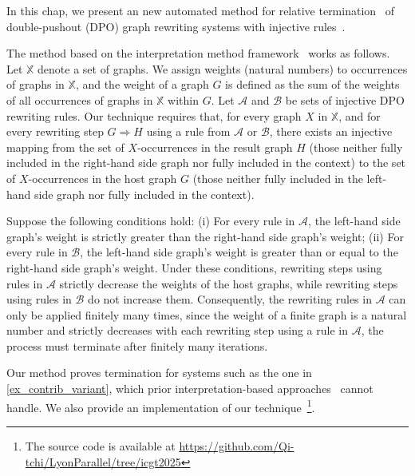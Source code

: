 
In this chap, we present an new automated method for relative termination~\cite{geser1990relative} of double-pushout (DPO) graph rewriting systems with injective rules~\cite{corradini1997algebraic,habel2001double,konig2018atutorial}. 

The method based on the interpretation method framework~\cite{nipkow1998term} works as follows. Let \( \mathbb{X} \) denote a set of graphs. We assign weights (natural numbers) to occurrences of graphs in \( \mathbb{X} \), and the weight of a graph $G$ is defined as the sum of the weights of all occurrences of graphs in \( \mathbb{X} \) within $G$. Let $\mathcal{A}$ and $\mathcal{B}$ be sets of injective DPO rewriting rules. Our technique requires that, for every graph $X$ in $\mathbb{X}$, and for every rewriting step $G \Rightarrow H$ using a rule from $\mathcal{A}$ or $\mathcal{B}$, there exists an injective mapping from the set of \( X \)-occurrences in the result graph $H$
(those neither fully included in the right-hand side graph nor fully included in the context)
 to the set of \( X \)-occurrences in the host graph $G$ (those neither fully included in the left-hand side graph nor fully included in the context).   

Suppose the following conditions hold: (i) For every rule in \( \mathcal{A} \), the left-hand side graph's weight is strictly greater than the right-hand side graph's weight; (ii) For every rule in \( \mathcal{B} \), the left-hand side graph's weight is greater than or equal to the right-hand side graph's weight. 
Under these conditions, rewriting steps using rules in \( \mathcal{A} \) strictly decrease the weights of the host graphs, while rewriting steps using rules in \( \mathcal{B} \) do not increase them.
Consequently, the rewriting rules in \( \mathcal{A} \) can only be applied finitely many times, since the weight of a finite graph is a natural number and strictly decreases with each rewriting step using a rule in \( \mathcal{A} \), the process must terminate after finitely many iterations.  

Our method proves termination for systems such as the one in \autoref{ex_contrib_variant}, which prior interpretation-based approaches~\cite{zantema2014termination,bruggink2014termination,bruggink2015proving,
endrullis2024generalized_arxiv_v2,
overbeek2024termination_lmcs} cannot handle. 
We also provide an implementation of our technique~\footnote{The source code is available at \url{https://github.com/Qi-tchi/LyonParallel/tree/icgt2025}}.  
   
